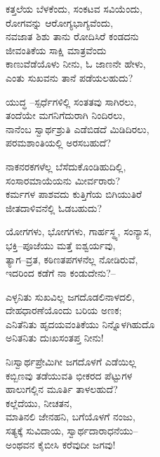 \begin{myquote}
ಕತ್ತಲೆಯ ಬೆಳಕೆಂದು, ಸಂಕಟವ ಸವಿಯೆಂದು,\\ರೋಗವನ್ನು ಆರೋಗ್ಯಭಾಗ್ಯವೆಂದು,\\ನವಜಾತ ಶಿಶು ತಾನು ರೋದಿಸಿರೆ ಕಂಡದನು\\ಜೀವಂತಿಕೆಯ ಸಾಕ್ಷಿ ಮಾತ್ರವೆಂದು\\ಕಾಣುವೆಡೆಯೊಳು ನೀನು, ಓ ಜಾಣನೇ ಹೇಳು,\\ಎಂತು ಸುಖವನು ತಾನೆ ಪಡೆಯಲಹುದು?
\end{myquote}

\begin{myquote}
ಯುದ್ಧ –ಸ್ಪರ್ಧೆಗಳಿಲ್ಲಿ ಸಂತತವು ಸಾಗಿರಲು,\\ತಂದೆಯೇ ಮಗನಿಗೆದುರಾಗಿ ನಿಂದಿರಲು,\\ನಾನೆಂಬ ಸ್ವಾರ್ಥಶ್ರುತಿ ಎಡೆಬಿಡದೆ ಮಿಡಿದಿರಲು,\\ಪರಮಶಾಂತಿಯಲ್ಲಿ ಅರಸಬಹುದೆ? 
\end{myquote}

\begin{myquote}
ನಾಕನರಕಗಳೆಲ್ಲ ಬೆಸೆದುಕೊಂಡಿಹುದಿಲ್ಲಿ,\\ಸಂಸಾರಮಾಯೆಯನು ಮೀರ್ವರಾರು?\\ಕರ್ಮಗಳ ಪಾಶವದು ಕುತ್ತಿಗೆಯ ಬಿಗಿಯುತಿರೆ\\ಜೀತದಾಳಿವನೆಲ್ಲಿ ಓಡಬಹುದು?
\end{myquote}

\begin{myquote}
ಯೋಗಗಳು, ಭೋಗಗಳು, ಗಾರ್ಹಸ್ಥ್ಯ, ಸಂನ್ಯಾಸ,\\ಭಕ್ತಿ–ಪೂಜೆಯು ಮತ್ತೆ ಐಶ್ವರ್ಯವು,\\ತ್ಯಾಗ–ವ್ರತ, ಕಠಿಣತಪಗಳನೆಲ್ಲ ನೋಡಿರುವೆ,\\ಇದರಿಂದ ಕಡೆಗೆ ನಾ ಕಂಡುದೇನು?–
\end{myquote}

\begin{myquote}
ಎಳ್ಳನಿತು ಸುಖವಿಲ್ಲ ಜಗದೊಡಲಿನಾಳದಲಿ,\\ದೇಹಧಾರಣೆಯೊಂದು ಬರಿಯ ಅಣಕ; \\ಎನಿತೆನಿತು ಹೃದಯವಂತಿಕೆಯು ನಿನ್ನೊಳಗಿಹುದೊ\\ಅನಿತನಿತು ದುಃಖಸಂತಪ್ತ ನೀನು!
\end{myquote}

\begin{myquote}
ನಿಃಸ್ವಾರ್ಥಪ್ರೇಮಿಗೀ ಜಗದೊಳಗೆ ಎಡೆಯಿಲ್ಲ\\ಕಬ್ಬಿಣವು ತಡೆಯುವತಿ ಭೀಕರದ ಪೆಟ್ಟುಗಳ\\ಹಾಲುಗಲ್ಲಿನ ಮೂರ್ತಿ ತಾಳಲಹುದೆ?\\ಕಲ್ಲೆದೆಯು, ನೀಚತನ,\\ಮಾತಿನಲಿ ಜೇನಹನಿ, ಬಗೆಯೊಳಗೆ ನಂಜು,\\ಸತ್ಯಕ್ಕೆ ಸುವಿದಾಯ, ಸ್ವಾರ್ಥದಾರಾಧನೆಯು–\\ಅಂಥವನ ಕೈಬೀಸಿ ಕರೆವುದೀ ಜಗವು!
\end{myquote}

